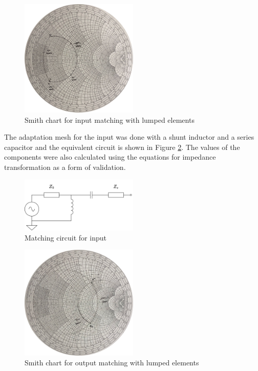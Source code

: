 \begin{figure}[H]
    \centering
    \includegraphics[width=0.5\textwidth]{Images/zs-LC-matching.png}
    \caption{Smith chart for input matching with lumped elements}
    \label{fig:zs-LC-matching}
\end{figure}

The adaptation mesh for the input was done with a shunt inductor and a series capacitor and the equivalent circuit is shown in Figure \ref{fig:MatchingCircuit-input}. The values of the components were also calculated using the equations for impedance transformation as a form of validation.

\begin{figure}[H]
    \centering
    \includegraphics[width=0.5\textwidth]{Images/Input-matching-circuit.png}
    \caption{Matching circuit for input}
    \label{fig:MatchingCircuit-input}
\end{figure}

\begin{figure}[H]
    \centering
    \includegraphics[width=0.5\textwidth]{Images/zl-LC-matching.png}
    \caption{Smith chart for output matching with lumped elements}
    \label{fig:zl-LC-matching}
\end{figure}

